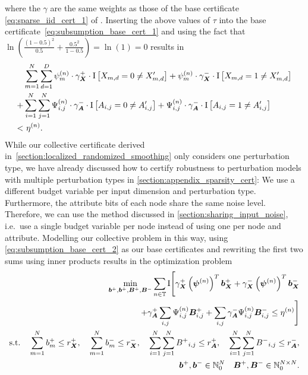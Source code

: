 where the $\gamma$ are the same weights as those of the base certificate \autoref{eq:sparse_iid_cert_1} of \citet{Schuchardt2021}.
Inserting the above values of $\tau$ into the base certificate~\autoref{eq:subsumption_base_cert_1} and using the fact that 
$\ln\left( \frac{\left(1 - 0.5\right)^2}{0.5} + \frac{0.5^2}{1 - 0.5} \right) = \ln(1) = 0$ results in
\begin{equation}
\begin{split}\label{eq:subsumption_base_cert_2}
        &\sum_{m=1}^{N}\sum_{d=1}^{D}
             \evpsi^{(n)}_m \cdot \gamma_\mX^{+} \cdot \mathrm{I}\left[\emX_{m,d} = 0 \neq \emX'_{m,d}\right]  + 
             \evpsi^{(n)}_m \cdot \gamma_\mX^{-} \cdot \mathrm{I}\left[\emX_{m,d} = 1 \neq \emX'_{m,d}\right]
            \\
            +
            &
           \sum_{i=1}^{N}\sum_{j=1}^{N}
             \emPsi^{(n)}_{i,j} \cdot \gamma_\mA^{-} \cdot \mathrm{I}\left[\emA_{i,j} = 0 \neq \emA'_{i,j}\right]  + 
            \emPsi^{(n)}_{i,j} \cdot \gamma_\mA^{-} \cdot \mathrm{I}\left[\emA_{i,j} = 1 \neq \emA'_{i,j}\right]
                        \\
           <
           & \ 
            \eta^{(n)}.
\end{split}
\end{equation}
While our collective certificate derived in~\autoref{section:localized_randomized_smoothing} only considers one perturbation type, we have already discussed how to certify robustness to perturbation models with multiple perturbation types in \autoref{section:appendix_sparsity_cert}:
We use a different budget variable per input dimension and perturbation type.
Furthermore, the attribute bits of each node share the same noise level. Therefore, we can use the method discussed in \autoref{section:sharing_input_noise}, i.e.~use a single budget variable per node instead of using one per node and attribute.
Modelling our collective problem in this way, using \autoref{eq:subsumption_base_cert_2} as our base certificates
and rewriting the first two sums using inner products 
results in the optimization problem
\begin{align}
    \min_{{\bm{b}}^{+},{\bm{b}}^{+},{\bm{B}}^{+},{\bm{B}}^{-}}
    \sum_{n \in {\mathbb{T}}} \mathrm{I}
    \Biggl[
    \gamma_{\bm{X}}^{+} \left({\bm{\psi}}^{(n)}\right)^T {\bm{b}}_{\bm{X}}^{+}  + \gamma_{\bm{X}}^{-} \left({\bm{\psi}}^{(n)}\right)^T {\bm{b}}_{\bm{X}}^{-} 
    \notag\\
    + \gamma_{\bm{A}}^{+} \sum_{i,j}{\Psi}^{(n)}_{i,j} {\bm{B}}_{i,j}^{+}  + \sum_{i,j} \gamma_{\bm{A}}^{-} {\Psi}^{(n)}_{i,j} {\bm{B}}_{i,j}^{-} \leq \eta^{(n)}
    \Biggr]
    \\
    \text{s.t.} \quad
    \sum_{m=1}^N {b}^{+}_m \leq r_{\bm{X}}^{+},
    \quad
    \sum_{m=1}^N {b}^{-}_m \leq r_{\bm{X}}^{-},
    \quad
    \sum_{i=1}^N \sum_{j=1}^N {{B}^{+}}_{i,j} \leq r_{\bm{A}}^{+},
    \quad
    \sum_{i=1}^N \sum_{j=1}^N {{B}^{-}}_{i,j} \leq r_{\bm{A}}^{-},
    \\
    {\bm{b}}^{+}, {\bm{b}}^{-} \in {\mathbb{N}}_0^{N} \quad {\bm{B}}^{+}, {\bm{B}}^{-} \in {\mathbb{N}}_0^{N \times N}.
\end{align}
